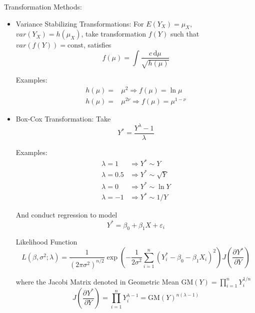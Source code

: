     Transformation Methods:
    \begin{itemize}[topsep=2pt,itemsep=2pt]
        \item Variance Stabilizing Transformations:
            For $ E(Y_X)=\mu_X$, $ var(Y_X)=h(\mu_X) $, take transformation $ f(Y) $ such that $ var(f(Y))=\mathrm{const} $, satisfies
            \begin{equation}
                f(\mu)=\int\dfrac{c\,\mathrm{d}\mu}{\sqrt{h(\mu)}} 
            \end{equation}

            Examples:
            \begin{align*}
                h(\mu)=&\mu^2\Rightarrow f(\mu )=\ln\mu\\
                h(\mu)=&\mu^{2\nu}\Rightarrow f(\mu )=\mu ^{1-\nu}
            \end{align*}
        
        \item Box-Cox Transformation: Take 
    \begin{equation}
        Y^*=\dfrac{Y^\lambda -1}{\lambda }
    \end{equation}

            Examples:
        \begin{align*}
            \lambda =1&\Rightarrow Y^*\sim Y\\
            \lambda =0.5&\Rightarrow Y^*\sim \sqrt{Y}\\
            \lambda =0&\Rightarrow Y^*\sim \ln Y\\
            \lambda =-1&\Rightarrow Y^*\sim 1/Y
        \end{align*}
    
        And conduct regression to model
        \begin{equation}
            Y^* =\beta _0+\beta _1X+\varepsilon_i 
        \end{equation}
        
        Likelihood Function
        \begin{equation}
            L(\beta ,\sigma ^2;\lambda )=\dfrac{1}{(2\pi\sigma ^2)^{n/2}}\exp\left( -\dfrac{1}{2\sigma ^2}\sum_{i=1}^n (Y_i^*-\beta _0-\beta _1X_i)^2 \right) J(\dfrac{\partial^{} Y^*}{\partial Y^{}})
        \end{equation}

        where the Jacobi Matrix denoted in Geometric Mean $ \mathrm{GM}(Y)=\prod_{i=1}^n Y_i^{1/n}$
        \begin{equation}
            J(\dfrac{\partial^{} Y^*}{\partial Y^{}})=\prod_{i=1}^nY_i^{\lambda -1}=\mathrm{GM}(Y)^{n(\lambda -1)}
        \end{equation}
        

\end{itemize}
